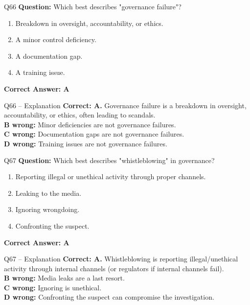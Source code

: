 \documentclass[aspectratio=169,10pt]{beamer}
\begin{document}
	\begin{frame}[t]{Q66}
		\small
		\textbf{Question:} Which best describes "governance failure"?
		\begin{enumerate}[label=\Alph*.,itemsep=1pt,topsep=2pt]
			\item Breakdown in oversight, accountability, or ethics.
			\item A minor control deficiency.
			\item A documentation gap.
			\item A training issue.
		\end{enumerate}
		\vspace{4pt}
		\textbf{Correct Answer: A}
	\end{frame}
	
	\begin{frame}[t]{Q66 -- Explanation}
		\small
		\textbf{Correct: A.} Governance failure is a breakdown in oversight, accountability, or ethics, often leading to scandals. \\[4pt]
		\textbf{B wrong:} Minor deficiencies are not governance failures. \\[2pt]
		\textbf{C wrong:} Documentation gaps are not governance failures. \\[2pt]
		\textbf{D wrong:} Training issues are not governance failures.
	\end{frame}
	
	\begin{frame}[t]{Q67}
		\small
		\textbf{Question:} Which best describes "whistleblowing" in governance?
		\begin{enumerate}[label=\Alph*.,itemsep=1pt,topsep=2pt]
			\item Reporting illegal or unethical activity through proper channels.
			\item Leaking to the media.
			\item Ignoring wrongdoing.
			\item Confronting the suspect.
		\end{enumerate}
		\vspace{4pt}
		\textbf{Correct Answer: A}
	\end{frame}
	
	\begin{frame}[t]{Q67 -- Explanation}
		\small
		\textbf{Correct: A.} Whistleblowing is reporting illegal/unethical activity through internal channels (or regulators if internal channels fail). \\[4pt]
		\textbf{B wrong:} Media leaks are a last resort. \\[2pt]
		\textbf{C wrong:} Ignoring is unethical. \\[2pt]
		\textbf{D wrong:} Confronting the suspect can compromise the investigation.
	\end{frame}
	
\end{document}
